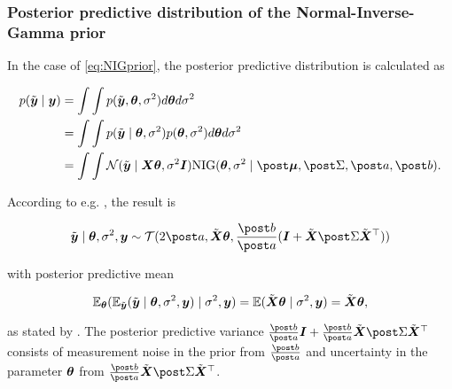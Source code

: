 \subsubsection*{Posterior predictive distribution of the Normal-Inverse-Gamma prior}

In the case of \eqref{eq:NIGprior}, the posterior predictive distribution is calculated as 

\begin{equation*}
    \begin{aligned}
        p(\ty \mid \by) 
        &= \int \int p(\ty, \btheta, \ssd) d \btheta d \ssd \\
        &= \int \int p(\ty \mid \btheta, \ssd) p(\btheta, \ssd) d \btheta d \ssd \\
        &= \int \int \Ncal(\ty \mid \bX \btheta, \ssd \bI) \text{NIG}(\btheta, \ssd \mid \mupo, \Sdpo, \apo, \bpo).
    \end{aligned}
\end{equation*}

According to e.g. \citet{murphy_conjugate_nodate}, the result is

\begin{equation*}
    \ty \mid \btheta, \ssd, \by \sim \Tcal(2 \apo, \tX \btheta, \frac{\bpo}{\apo} (\bI + \tX \Sdpo \tX^\top))
\end{equation*}

with posterior predictive mean

\begin{equation*}
    \mathbb{E}_{\bm{\theta}} ( \mathbb{E}_{\tilde{\bm{y}}} (\tilde{\bm{y}} \mid \bm{\theta}, \sigma^2, \bm{y}) \mid \sigma^2, \bm{y} ) = \mathbb{E} (\tilde{\bm{X}} \bm{\theta} \mid \sigma^2 , \bm{y}) = \tilde{\bm{X}} \bm{\theta},
\end{equation*}

as stated by \citet{gelman_bayesian_2013}. The posterior predictive variance $\frac{\bpo}{\apo} \bI + \frac{\bpo}{\apo} \tX \Sdpo \tX^\top$ consists of measurement noise in the prior from $\frac{\bpo}{\apo}$ and uncertainty in the parameter $\bm{\theta}$ from $\frac{\bpo}{\apo} \tX \Sdpo \tX^\top$. 